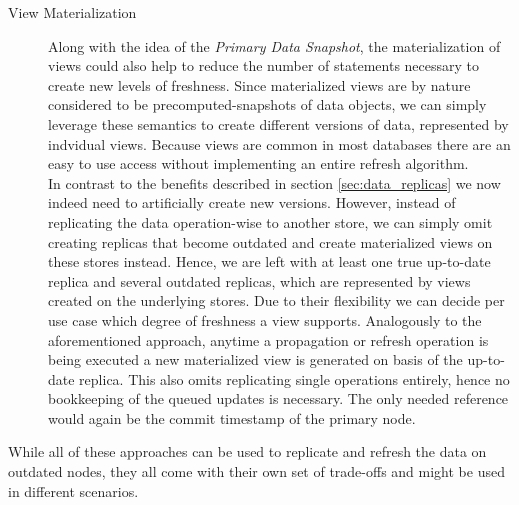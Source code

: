 \begin{description}
    \item [View Materialization]
    Along with the idea of the \emph{Primary Data Snapshot}, the materialization of views could also help to reduce the number of statements necessary to create new levels of freshness.
    Since materialized views are by nature considered to be precomputed-snapshots of data objects, we can simply leverage these semantics to create different versions of data, 
    represented by indvidual views.
    Because views are common in most databases there are an easy to use access without implementing an entire refresh algorithm.\\
    In contrast to the benefits described in section \ref{sec:data_replicas} we now indeed need to artificially create new versions.
    However, instead of replicating the data operation-wise to another store, we can simply omit creating replicas that become outdated and create materialized views on these 
    stores instead. Hence, we are left with at least one true up-to-date replica and several outdated replicas, which are represented by views created on the underlying stores.
    Due to their flexibility we can decide per use case which degree of freshness a view supports. 
    Analogously to the aforementioned approach, anytime a propagation or refresh operation is being executed a new materialized view is generated on basis of the up-to-date replica.
    This also omits replicating single operations entirely, hence no bookkeeping of the queued updates is necessary. 
    The only needed reference would again be the commit timestamp of the primary node. 


\end{description}


While all of these approaches can be used to replicate and refresh the data on outdated nodes,
they all come with their own set of trade-offs and might be used in different scenarios.

